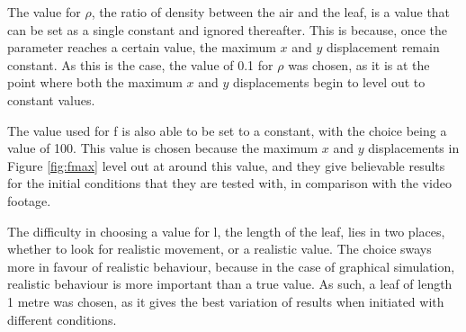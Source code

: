 \noindent The value for $\rho$, the ratio of density between the air and the leaf, is a value that can be set as a single constant and ignored thereafter. This is because, once the parameter reaches a certain value, the maximum $x$ and $y$ displacement remain constant. As this is the case, the value of 0.1 for $\rho$ was chosen, as it is at the point where both the maximum $x$ and $y$ displacements begin to level out to constant values. \newline

\noindent The value used for f is also able to be set to a constant, with the choice being a value of 100. This value is chosen because the maximum $x$ and $y$ displacements in Figure \ref{fig:fmax} level out at around this value, and they give believable results for the initial conditions that they are tested with, in comparison with the video footage. \newline


\noindent The difficulty in choosing a value for l, the length of the leaf, lies in two places, whether to look for realistic movement, or a realistic value. The choice sways more in favour of realistic behaviour, because in the case of graphical simulation, realistic behaviour is more important than a true value. As such, a leaf of length 1 metre was chosen, as it gives the best variation of results when initiated with different conditions. 



